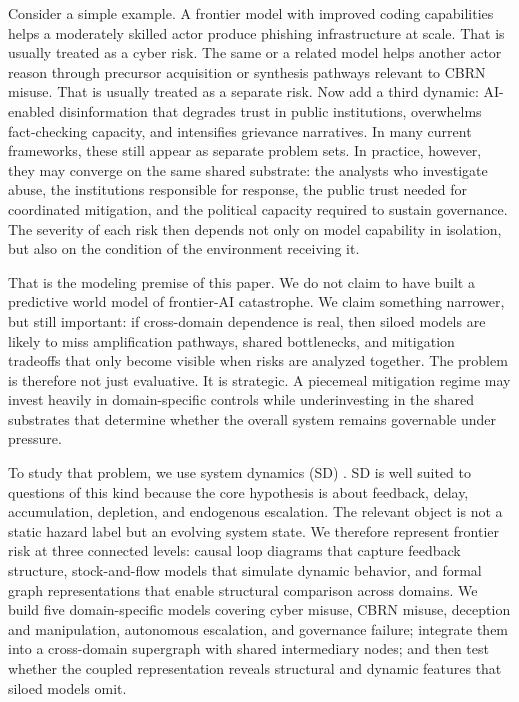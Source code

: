 \documentclass[11pt]{article}
\begin{document}
Consider a simple example. A frontier model with improved coding capabilities helps a moderately skilled actor produce phishing infrastructure at scale. That is usually treated as a cyber risk. The same or a related model helps another actor reason through precursor acquisition or synthesis pathways relevant to CBRN misuse. That is usually treated as a separate risk. Now add a third dynamic: AI-enabled disinformation that degrades trust in public institutions, overwhelms fact-checking capacity, and intensifies grievance narratives. In many current frameworks, these still appear as separate problem sets. In practice, however, they may converge on the same shared substrate: the analysts who investigate abuse, the institutions responsible for response, the public trust needed for coordinated mitigation, and the political capacity required to sustain governance. The severity of each risk then depends not only on model capability in isolation, but also on the condition of the environment receiving it.

That is the modeling premise of this paper. We do not claim to have built a predictive world model of frontier-AI catastrophe. We claim something narrower, but still important: if cross-domain dependence is real, then siloed models are likely to miss amplification pathways, shared bottlenecks, and mitigation tradeoffs that only become visible when risks are analyzed together. The problem is therefore not just evaluative. It is strategic. A piecemeal mitigation regime may invest heavily in domain-specific controls while underinvesting in the shared substrates that determine whether the overall system remains governable under pressure.

To study that problem, we use system dynamics (SD) \citep{forrester1961,sterman2000,meadows2008}. SD is well suited to questions of this kind because the core hypothesis is about feedback, delay, accumulation, depletion, and endogenous escalation. The relevant object is not a static hazard label but an evolving system state. We therefore represent frontier risk at three connected levels: causal loop diagrams that capture feedback structure, stock-and-flow models that simulate dynamic behavior, and formal graph representations that enable structural comparison across domains. We build five domain-specific models covering cyber misuse, CBRN misuse, deception and manipulation, autonomous escalation, and governance failure; integrate them into a cross-domain supergraph with shared intermediary nodes; and then test whether the coupled representation reveals structural and dynamic features that siloed models omit.
\end{document}
